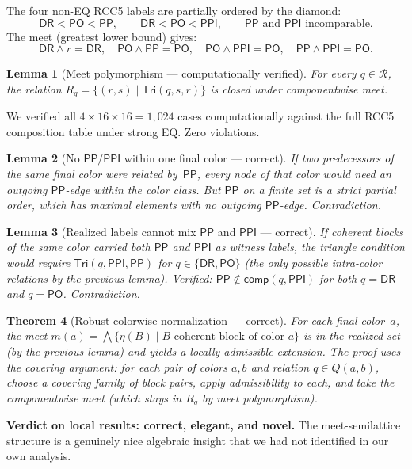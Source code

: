\documentclass[a4paper,11pt]{article}
\newtheorem{theorem}{Theorem}[section]
\newtheorem{lemma}[theorem]{Lemma}
\theoremstyle{definition}
\newcommand{\DR}{\ensuremath{\mathsf{DR}}}
\newcommand{\PO}{\ensuremath{\mathsf{PO}}}
\newcommand{\PP}{\ensuremath{\mathsf{PP}}}
\newcommand{\PPI}{\ensuremath{\mathsf{PPI}}}
\newcommand{\comp}{\ensuremath{\mathsf{comp}}}
\newcommand{\Tri}{\ensuremath{\mathsf{Tri}}}
\newcommand{\Roles}{\ensuremath{\mathcal{R}}}
\begin{document}
The four non-EQ RCC5 labels are partially ordered by the diamond:
\[
  \DR < \PO < \PP, \qquad \DR < \PO < \PPI,
  \qquad \PP \text{ and } \PPI \text{ incomparable}.
\]
The meet (greatest lower bound) gives:
\[
  \DR \wedge r = \DR, \quad
  \PO \wedge \PP = \PO, \quad
  \PO \wedge \PPI = \PO, \quad
  \PP \wedge \PPI = \PO.
\]

\begin{lemma}[Meet polymorphism --- computationally verified]
\label{lem:meet-poly}
For every $q \in \Roles$, the relation
$R_q = \{(r,s) \mid \Tri(q, s, r)\}$
is closed under componentwise meet.
\end{lemma}

\noindent
We verified all $4 \times 16 \times 16 = 1{,}024$ cases
computationally against the full RCC5 composition table under strong
EQ.  Zero violations.

\begin{lemma}[No $\PP/\PPI$ within one final color --- correct]
If two predecessors of the same final color were related by~$\PP$,
every node of that color would need an outgoing $\PP$-edge within the
color class.  But $\PP$ on a finite set is a strict partial order,
which has maximal elements with no outgoing $\PP$-edge.
Contradiction.
\end{lemma}

\begin{lemma}[Realized labels cannot mix $\PP$ and $\PPI$ --- correct]
If coherent blocks of the same color carried both $\PP$ and $\PPI$ as
witness labels, the triangle condition would require
$\Tri(q, \PPI, \PP)$ for $q \in \{\DR, \PO\}$ (the only possible
intra-color relations by the previous lemma).  Verified: $\PP \notin
\comp(q, \PPI)$ for both $q = \DR$ and $q = \PO$.  Contradiction.
\end{lemma}

\begin{theorem}[Robust colorwise normalization --- correct]
For each final color~$a$, the meet
$m(a) = \bigwedge \{\eta(B) \mid B \text{ coherent block of
color } a\}$
is in the realized set (by the previous lemma) and yields a locally
admissible extension.  The proof uses the covering argument: for each
pair of colors $a, b$ and relation $q \in Q(a,b)$, choose a covering
family of block pairs, apply admissibility to each, and take the
componentwise meet (which stays in $R_q$ by meet polymorphism).
\end{theorem}

\textbf{Verdict on local results: correct, elegant, and novel.}  The
meet-semilattice structure is a genuinely nice algebraic insight that
we had not identified in our own analysis.
\end{document}
